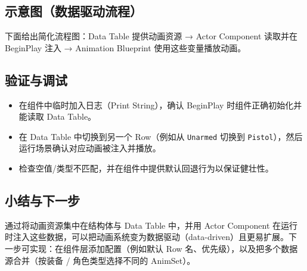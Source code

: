 \documentclass[10pt,CJKmath]{zhbook-v1}
\newcommand{\il}[1]{\texttt{#1}}%
\begin{document}
\subsection{示意图（数据驱动流程）}
下面给出简化流程图：Data Table 提供动画资源 → Actor Component 读取并在 BeginPlay 注入 → Animation Blueprint 使用这些变量播放动画。

\begin{center}
\end{center}

\subsection{验证与调试}
\begin{itemize}
  \item 在组件中临时加入日志（Print String），确认 BeginPlay 时组件正确初始化并能读取 Data Table。
  \item 在 Data Table 中切换到另一个 Row（例如从 \il{Unarmed} 切换到 \il{Pistol}），然后运行场景确认对应动画被注入并播放。
  \item 检查空值/类型不匹配，并在组件中提供默认回退行为以保证健壮性。
\end{itemize}

\subsection{小结与下一步}
通过将动画资源集中在结构体与 Data Table 中，并用 Actor Component 在运行时注入这些数据，可以把动画系统变为数据驱动（data-driven）且更易扩展。下一步可实现：在组件层添加配置（例如默认 Row 名、优先级），以及把多个数据源合并（按装备 / 角色类型选择不同的 AnimSet）。
\end{document}
